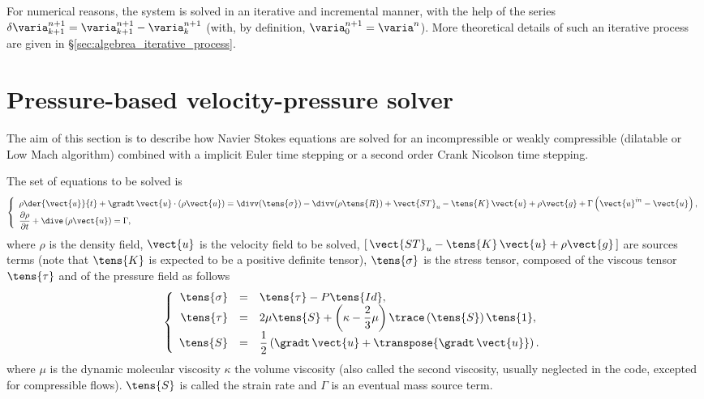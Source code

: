 For numerical reasons, the system is solved in an iterative and incremental
manner, with the help of the series $\delta \varia^{n+1}_{k+1}=\varia^{n+1}_{k+1}-\varia^{n+1}_{k}$
(with, by definition, $\varia^{n+1}_0=\varia^{n}$).
More theoretical details of such an iterative process are given in \S \ref{sec:algebrea_iterative_process}.

\section{Pressure-based velocity-pressure solver}
The aim of this section is to describe how Navier Stokes equations are solved for an incompressible
or weakly compressible (dilatable or Low Mach algorithm) combined with a
implicit Euler time stepping or a second order Crank Nicolson time stepping.

The set of equations to be solved is
\begin{equation}\label{eq:timstp:navier_stokes}
\left\{\begin{array}{l}
\displaystyle \rho \der{\vect{u}}{t} + \gradt \, \vect{u} \cdot \left( \rho\vect{u}  \right)
=\divv(\tens{\sigma}) - \divv(\rho \tens{R}) + \vect{ST}_u - \tens{K}\,\vect{u} + \rho \vect{g} + \Gamma \left( \vect{u}^{in} - \vect{u} \right), \\
\dfrac{\partial \rho}{\partial t} + \dive\left( \rho \vect{u} \right) = \Gamma ,
\end{array}\right.
\end{equation}
%
where $\rho$ is the density field, $\vect{u}$ is the velocity field to be solved,
$[\,\vect{ST}_u-\tens{K}\,\vect{u} + \rho \vect{g} \,]$  are sources terms (note that $\tens{K}$ is expected to be a positive definite tensor),
 $\tens{\sigma}$ is the stress tensor, composed of the viscous tensor $\tens{\tau}$ and of the pressure field as follows
\begin{equation}
\left\{\begin{array}{r c l}
\tens{\sigma} &=& \tens{\tau} - P\tens{Id} , \\%
\tens{\tau} & =& 2 \mu  \tens{S} +   \left( \kappa - \dfrac{2}{3}\mu \right)   \trace \left( \tens{S} \right) \tens{1} ,\\
\tens{S} &=& \dfrac{1}{2} \left( \gradt \, \vect{u}+\transpose{\gradt \, \vect{u}} \right) .
\end{array}\right.
\end{equation}
 where  $\mu$ is the dynamic molecular viscosity
 $\kappa$ the volume viscosity (also called the second viscosity, usually neglected in the code, excepted for compressible flows).
$\tens{S}$ is called the strain rate and  $\Gamma$ is an eventual mass source term.

